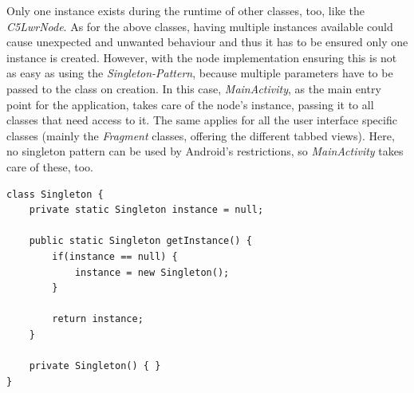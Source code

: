 Only one instance exists during the runtime of other classes, too, like the \textit{C5LwrNode}. As for the above classes, having multiple instances available could cause unexpected and unwanted behaviour and thus it has to be ensured only one instance is created. However, with the node implementation ensuring this is not as easy as using the \textit{Singleton-Pattern}, because multiple parameters have to be passed to the class on creation. In this case, \textit{MainActivity}, as the main entry point for the application, takes care of the node's instance, passing it to all classes that need access to it. The same applies for all the user interface specific classes (mainly the \textit{Fragment} classes, offering the different tabbed views). Here, no singleton pattern can be used by Android's restrictions, so \textit{MainActivity} takes care of these, too.

\begin{minipage}{\linewidth}
\begin{lstlisting}[caption={Example implementation of the Observer-Pattern}, label=lst:conc:obs]
class Singleton {
	private static Singleton instance = null;

	public static Singleton getInstance() {
		if(instance == null) {
			instance = new Singleton();
		}
		
		return instance;
	}
	
	private Singleton() { }
}
\end{lstlisting}
\end{minipage}
